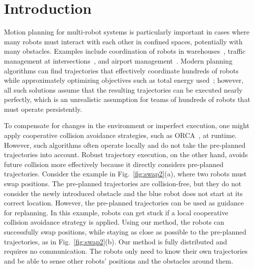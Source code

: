 \documentclass{svproc}
\begin{document}
\section{Introduction}
Motion planning for multi-robot systems is particularly important in cases where many robots must interact with each other in confined spaces, potentially with many obstacles.
Examples include coordination of robots in warehouses~\cite{Kiva}, traffic management at intersections~\cite{IntersectionManagementDresner}, and airport management~\cite{AirportTug}.
Modern planning algorithms can find trajectories that effectively coordinate hundreds of robots while approximately optimizing objectives such as total energy used~\cite{crazyplanning-ieeetro};
however, all such solutions assume that the resulting trajectories can be executed nearly perfectly, which is an unrealistic assumption for teams of hundreds of robots that must operate persistently.

To compensate for changes in the environment or imperfect execution, one might apply cooperative collision avoidance strategies, such as ORCA~\cite{orca}, at runtime.
However, such algorithms often operate locally and do not take the pre-planned trajectories into account.
Robust trajectory execution, on the other hand, avoids future collision more effectively because it directly considers pre-planned trajectories.
Consider the example in Fig.~\ref{fig:swap2}(a), where two robots must swap positions.
The pre-planned trajectories are collision-free, but they do not consider the newly introduced obstacle and the blue robot does not start at its correct location.
However, the pre-planned trajectories can be used as guidance for replanning.
In this example, robots can get stuck if a local cooperative collision avoidance strategy is applied.
Using our method, the robots can successfully swap positions, while staying as close as possible to the pre-planned trajectories, as in Fig.~\ref{fig:swap2}(b).
Our method is fully distributed and requires no communication. The robots only need to know their own trajectories and be able to sense other robots' positions and the obstacles around them.
\end{document}
